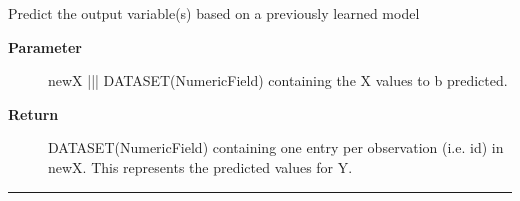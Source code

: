 \par
Predict the output variable(s) based on a previously learned model

\par
\begin{description}
\item [\textbf{Parameter}] newX ||| DATASET(NumericField) containing the X values to b predicted.
\item [\textbf{Return}] DATASET(NumericField) containing one entry per observation (i.e. id) in newX. This represents the predicted values for Y.
\end{description}

\rule{\linewidth}{0.5pt}


